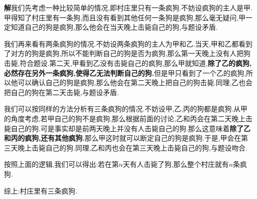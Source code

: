 \documentclass{article}
\begin{document}
\par\textbf{解}\quad 我们先考虑一种比较简单的情况,即村庄里只有一条疯狗.不妨设疯狗的主人是甲.甲得知了村庄里有一条狗,而且没有看到其他任何一条狗是疯狗,那么毫无疑问,甲一定知道自己的狗是疯狗,那么他会在当天晚上击毙自己的狗,与题设矛盾.
\par 我们再来看有两条疯狗的情况.不妨设两条疯狗的主人为甲和乙.当天,甲和乙都看到了对方的狗是疯狗,所以不能判断自己的狗是否为疯狗,那么第一天晚上没有人把狗击毙,符合题设.第二天,甲看到乙没有击毙自己的疯狗,那么甲就知道,\textbf{除了乙的疯狗,必然存在另外一条疯狗,使得乙无法判断自己的狗.}但是甲只看到了一个乙的疯狗,所以他可以确认自己的狗是疯狗,那么他会在第二天晚上把自己的狗击毙.同理,乙也会把自己的狗在第二天击毙,与题设矛盾.
\par 我们可以按同样的方法分析有三条疯狗的情况.不妨设甲,乙,丙的狗都是疯狗.从甲的角度考虑,若甲自己的狗不是疯狗,那么根据前面的讨论,乙和丙会在第二天晚上击毙自己的狗.可是事实却是前两天晚上并没有人击毙自己的狗.那么这意味着\textbf{除了乙和丙的疯狗,还有其他疯狗.}那么甲这时就可以断定自己的狗是疯狗.于是,甲会在第三天晚上击毙自己的狗.同理,乙和丙也会在第三天晚上击毙自己的狗,与题设吻合.
\par 按照上面的逻辑,我们可以得出:若在第$n$天有人击毙了狗,那么整个村庄就有$n$条疯狗.
\par 综上:村庄里有三条疯狗.
\end{document}

